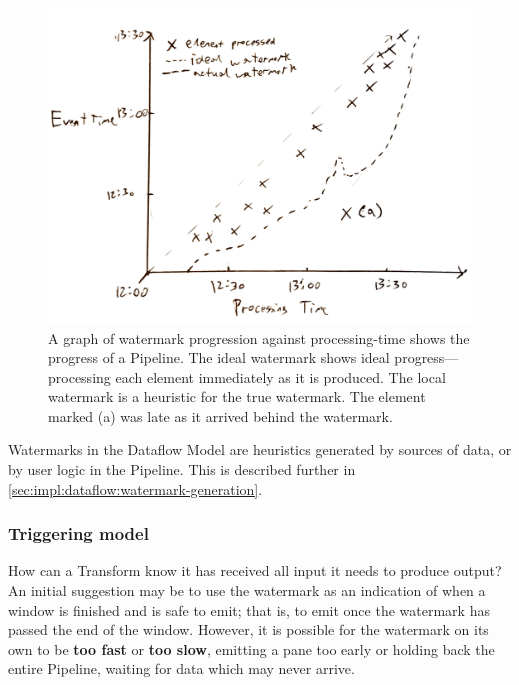\begin{figure}[h]
	\includegraphics[width=\textwidth]{images/temp/watermark-progression-example}
	\caption[An example of a watermark progression plotted against processing-time, showing late data as falling behind the watermark.]{A graph of watermark progression against processing-time shows the progress of a Pipeline. The ideal watermark shows ideal progress---processing each element immediately as it is produced. The local watermark is a heuristic for the true watermark. The element marked (a) was late as it arrived behind the watermark.}
	\label{fig:prep:watermark-progression}
\end{figure}

Watermarks in the Dataflow Model are heuristics generated by sources of data, or by user logic in the Pipeline.
This is described further in \cref{sec:impl:dataflow:watermark-generation}.

\subsubsection{Triggering model}

How can a Transform know it has received all input it needs to produce output?
An initial suggestion may be to use the watermark as an indication of when a window is finished and is safe to emit; that is, to emit once the watermark has passed the end of the window.
However, it is possible for the watermark on its own to be \textbf{too fast} or \textbf{too slow}, emitting a pane too early or holding back the entire Pipeline, waiting for data which may never arrive.

